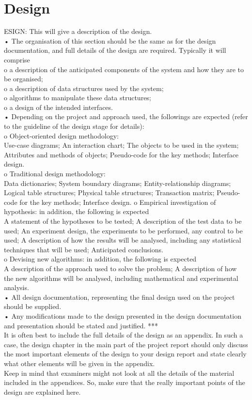 \chapter{Design}
\label{ch:design}

ESIGN:
This will give a description of the design. \\
• The organisation of this section should be the same as for the design
documentation, and full details of the design are required. Typically it will comprise\\
o a description of the anticipated components of the system and how they
are to be organised; \\
o a description of data structures used by the system; \\
o algorithms to manipulate these data structures; \\
o a design of the intended interfaces. \\
• Depending on the project and approach used, the followings are expected
(refer to the guideline of the design stage for details): \\
o Object-oriented design methodology: \\
Use-case diagrams; An interaction chart; The objects to be used in the
system; Attributes and methods of objects; Pseudo-code for the key
methods; Interface design. \\
o Traditional design methodology: \\
Data dictionaries; System boundary diagrams; Entity-relationship 
diagrams; Logical table structures; Physical table structures;
Transaction matrix; Pseudo-code for the key methods; Interface design.
o Empirical investigation of hypothesis: in addition, the following is
expected \\
A statement of the hypotheses to be tested; A description of the test
data to be used; An experiment design, the experiments to be
performed, any control to be used; A description of how the results will
be analysed, including any statistical techniques that will be used;
Anticipated conclusions. \\
o Devising new algorithms: in addition, the following is expected \\
A description of the approach used to solve the problem; A description
of how the new algorithms will be analysed, including mathematical
and experimental analysis. \\
• All design documentation, representing the final design used on the project
should be supplied. \\
• Any modifications made to the design presented in the design documentation
and presentation should be stated and justified. *** \\
It is often best to include the full details of the design as an appendix. In such a case,
the design chapter in the main part of the project report should only discuss the most
important elements of the design to your design report and state clearly what other
elements will be given in the appendix. \\
Keep in mind that examiners might not look at all the details of the material included
in the appendices. So, make sure that the really important points of the design are
explained here. \\

